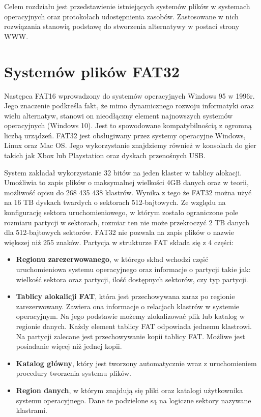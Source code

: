 Celem rozdziału jest przedstawienie istniejących systemów plików w systemach operacyjnych oraz protokołach udostępnienia zasobów. Zastosowane w nich rozwiązania stanowią podstawę do stworzenia alternatywy w postaci strony WWW.
\section{Systemów plików FAT32} 
Następca FAT16 \cite{FAT16:limitation} wprowadzony do systemów operacyjnych Windows 95 w 1996r. Jego znaczenie podkreśla fakt, że mimo dynamicznego rozwoju informatyki oraz wielu alternatyw, stanowi on nieodłączny element najnowszych systemów operacyjnych (Windows 10). Jest to spowodowane kompatybilnością z ogromną liczbą urządzeń. FAT32 jest obsługiwany przez systemy operacyjne Windows, Linux oraz Mac OS. Jego wykorzystanie znajdziemy również w konsolach do gier takich jak Xbox lub Playstation oraz dyskach przenośnych USB. 

System zakładał wykorzystanie 32 bitów na jeden klaster w tablicy alokacji. Umożliwia to zapis plików o maksymalnej wielkości 4GB danych oraz w teorii, możliwość opisu do 268 435 438 klastrów. Wynika z tego że FAT32 można użyć na 16 TB dyskach twardych o sektorach 512-bajtowych. Ze względu na konfigurację sektora uruchomieniowego, w którym zostało ograniczone pole rozmiaru partycji w sektorach, rozmiar ten nie może przekroczyć 2 TB danych dla 512-bajtowych sektorów. FAT32 nie pozwala na zapis plików o nazwie większej niż 255 znaków. Partycja w strukturze FAT składa się z 4 części: 
\\
\begin{itemize}  
	\item \textbf{Regionu zarezerwowanego}, w którego skład wchodzi część uruchomieniowa systemu operacyjnego oraz informacje o partycji takie jak: wielkość sektora oraz partycji, ilość dostępnych sektorów, czy typ partycji.
	\\
	\item \textbf{Tablicy alokalicji FAT}, która jest przechowywana zaraz po regionie zarezerwowany. Zawiera ona informacje o relacjach klastrów w systemie operacyjnym. Na jego podstawie możemy zlokalizować plik lub katalog w regionie danych. Każdy element tablicy FAT odpowiada jednemu klastrowi. Na partycji zalecane jest przechowywanie kopii tablicy FAT. Możliwe jest posiadanie więcej niż jednej kopii.
	\\
	\item \textbf{Katalog główny}, który jest tworzony automatycznie wraz z uruchomieniem procedury tworzenia systemu plików.
	\\
	\item \textbf{Region danych}, w którym znajdują się pliki oraz katalogi użytkownika systemu operacyjnego. Dane te podzielone są na logiczne sektory nazywane klastrami.\\
\end{itemize}

